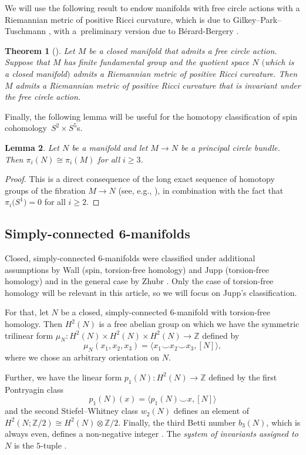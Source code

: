 \documentclass[pdftex]{sigma}
\numberwithin{equation}{section}
\newtheorem{Theorem}{Theorem}[section]
\newtheorem{Lemma}[Theorem]{Lemma}
\theoremstyle{definition}
\numberwithin{table}{section}
\newcommand{\Z}{\mathbb{Z}}
\begin{document}
We will use the following result to endow manifolds with free circle actions with a Riemannian metric of positive Ricci curvature, which is due to Gilkey--Park--Tuschmann \cite{GPT98}, with a~preliminary version due to B\'erard-Bergery \cite{BB78}.
\begin{Theorem}[{\cite{BB78,GPT98}}]\label{T:Ric>0_bdl}
	Let $M$ be a closed manifold that admits a free circle action. Suppose that $M$ has finite fundamental group and the quotient space $N$ $($which is a closed manifold$)$ admits a Riemannian metric of positive Ricci curvature. Then $M$ admits a Riemannian metric of positive Ricci curvature that is invariant under the free circle action.
\end{Theorem}

Finally, the following lemma will be useful for the homotopy classification of spin cohomology~${S^2\times S^5}$s.
\begin{Lemma}\label{L:princ_circ_hom}
	Let $N$ be a manifold and let $M\to N$ be a principal circle bundle. Then $\pi_i(N)\cong\pi_i(M)$ for all $i\geq 3$.
\end{Lemma}
\begin{proof}
	This is a direct consequence of the long exact sequence of homotopy groups of the fibration $M\to N$ (see, e.g., \cite[Corollary 6.44]{DK01}), in combination with the fact that $\pi_i\bigl(S^1\bigr)=0$ for all $i\geq 2$.
\end{proof}

\subsection{Simply-connected 6-manifolds}

Closed, simply-connected $6$-manifolds were classified under additional assumptions by Wall \mbox{\cite{Wa66,Wa67}} (spin, torsion-free homology) and Jupp \cite{Ju73} (torsion-free homology) and in the general case by Zhubr \cite{Zu75,Zh00}. Only the case of torsion-free homology will be relevant in this article, so we will focus on Jupp's classification.

For that, let $N$ be a closed, simply-connected $6$-manifold with torsion-free homology. Then $H^2(N)$ is a free abelian group on which we have the symmetric trilinear form $\mu_N\colon H^2(N)\times H^2(N)\times H^2(N)\to \Z$ defined by
\[ \mu_N(x_1,x_2,x_3)=\langle x_1\smile x_2\smile x_3,[N]\rangle, \]
where we chose an arbitrary orientation on $N$.

Further, we have the linear form $p_1(N)\colon H^2(N)\to \Z$ defined by the first Pontryagin class
\[ p_1(N)(x)=\langle p_1(N)\smile x,[N]\rangle \]
and the second Stiefel--Whitney class $w_2(N)$ defines an element of $H^2(N;\Z/2)\cong H^2(N)\otimes\Z/2$. Finally, the third Betti number $b_3(N)$, which is always even, defines a non-negative integer .	The \emph{system of invariants assigned to $N$} is the $5$-tuple .
\end{document}

